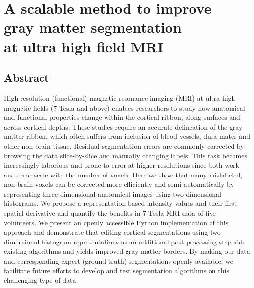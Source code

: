 \chapter[A scalable method to improve gray matter segmentation at ultra high field MRI]{A scalable method to improve\\ gray matter segmentation\\ at ultra high field MRI}

\clearpage{\thispagestyle{empty}\cleardoublepage}

\section{Abstract}
High-resolution (functional) magnetic resonance imaging (MRI) at ultra high magnetic fields (7 Tesla and above) enables researchers to study how anatomical and functional properties change within the cortical ribbon, along surfaces and across cortical depths. These studies require an accurate delineation of the gray matter ribbon, which often suffers from inclusion of blood vessels, dura mater and other non-brain tissue. Residual segmentation errors are commonly corrected by browsing the data slice-by-slice and manually changing labels. This task becomes increasingly laborious and prone to error at higher resolutions since both work and error scale with the number of voxels. Here we show that many mislabeled, non-brain voxels can be corrected more efficiently and semi-automatically by representing three-dimensional anatomical images using two-dimensional histograms. We propose a representation based intensity values and their first spatial derivative and quantify the benefits in 7 Tesla MRI data of five volunteers. We present an openly accessible Python implementation of this approach and demonstrate that editing cortical segmentations using two-dimensional histogram representations as an additional post-processing step aids existing algorithms and yields improved gray matter borders. By making our data and corresponding expert (ground truth) segmentations openly available, we facilitate future efforts to develop and test segmentation algorithms on this challenging type of data.


